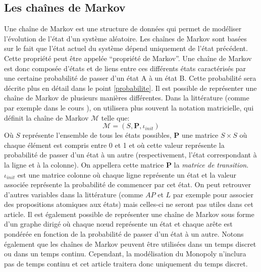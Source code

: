 \documentclass[letterpaper]{article}
\begin{document}
  \subsection{Les chaînes de Markov}
    \label{def_chaine_markov}
    Une chaîne de Markov est une structure de données qui permet de modéliser l'évolution
    de l'état d'un système aléatoire.  Les chaînes de Markov sont basées sur le
    fait que l'état actuel du système dépend uniquement de l'état précédent.
    Cette propriété peut être appelée ``propriété de Markov''.  Une chaîne de
    Markov est donc composée d'états et de liens entre ces différents états caractérisés
    par une certaine probabilité de passer d'un état A à un état B.
    Cette probabilité sera décrite plus en détail dans le point \ref{probabilite}.
    Il est possible de représenter une chaîne de Markov de plusieurs manières différentes.
    Dans la littérature (comme par exemple dans le cours \citet{COURS}), on utilisera
    plus souvent la notation matricielle, qui définit la chaîne de Markov $\mathcal{M}$
    telle que:
    $$\mathcal{M} = (S, \mathbf{P}, \iota_{init})$$
    Où $S$ représente l'ensemble de tous les états possibles, $\mathbf{P}$ une matrice $S \times S$
    où chaque élément est compris entre 0 et 1 et où cette valeur représente la probabilité
    de passer d'un état à un autre (respectivement, l'état correspondant à la ligne et à la colonne).
    On appellera cette matrice $\mathbf{P}$ la \textit{matrice de transition}.
    $\iota_{init}$ est une matrice colonne où chaque ligne représente un état et la valeur
    associée représente la probabilité de commencer par cet état.  On peut retrouver d'autres
    variables dans la littérature (comme $AP$ et $L$ par exemple pour associer des propositions
    atomiques aux états) mais celles-ci ne seront pas utiles dans cet article.
    Il est également possible de représenter une chaîne de Markov sous forme
    d'un graphe dirigé où chaque nœud représente un état et chaque arête est pondérée
    en fonction de la probabilité de passer d'un état à un autre.
    Notons également que les chaînes de Markov peuvent être utilisées
    dans un temps discret ou dans un temps continu.  Cependant, la modélisation
    du Monopoly n’inclura pas de temps continu et cet article traitera donc uniquement
    du temps discret.
\end{document}
